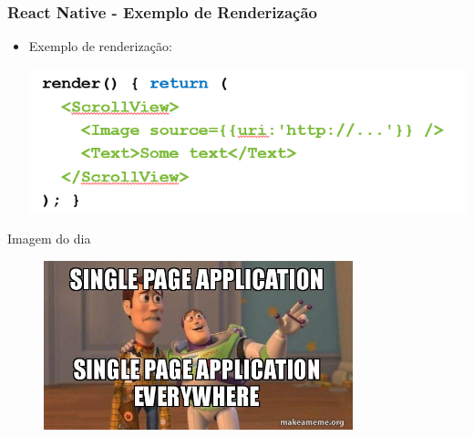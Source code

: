 \documentclass{beamer}
\begin{document}
            \begin{frame}
            \frametitle{React Native - Exemplo de Renderização}
            
            \begin{itemize}
                \item Exemplo de renderização:
                \begin{center}
                  \includegraphics[width=0.8\linewidth]{assets/aula-tads-pdwa5/react-render.png}
            \end{center}
            \end{itemize}
            
            \end{frame}
            

\footlinecolor{}
\begin{frame}[fragile]{Imagem do dia}

      \begin{figure}[H]
          \centerline{\includegraphics[width=0.8\textwidth]{assets/imagem-do-dia/single-page-application.jpg}}
          
      \end{figure}
\end{frame}
\backmatter
\end{document}
